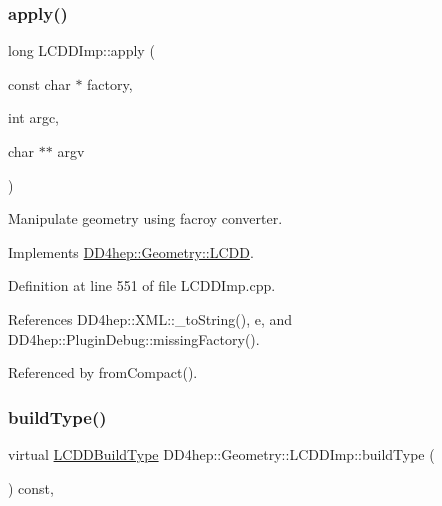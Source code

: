 \subsubsection{\texorpdfstring{apply()}{apply()}}
{\footnotesize\ttfamily long L\+C\+D\+D\+Imp\+::apply (\begin{DoxyParamCaption}\item[{const char $\ast$}]{factory,  }\item[{int}]{argc,  }\item[{char $\ast$$\ast$}]{argv }\end{DoxyParamCaption})\hspace{0.3cm}{\ttfamily [virtual]}}



Manipulate geometry using facroy converter. 



Implements \hyperlink{class_d_d4hep_1_1_geometry_1_1_l_c_d_d_ab47f82e5a5bfda6f58624b3553a08c68}{D\+D4hep\+::\+Geometry\+::\+L\+C\+DD}.



Definition at line 551 of file L\+C\+D\+D\+Imp.\+cpp.



References D\+D4hep\+::\+X\+M\+L\+::\+\_\+to\+String(), e, and D\+D4hep\+::\+Plugin\+Debug\+::missing\+Factory().



Referenced by from\+Compact().

\hypertarget{class_d_d4hep_1_1_geometry_1_1_l_c_d_d_imp_ae875ad95398b372818df92a1e6752ff5}{}\label{class_d_d4hep_1_1_geometry_1_1_l_c_d_d_imp_ae875ad95398b372818df92a1e6752ff5} 
\subsubsection{\texorpdfstring{build\+Type()}{buildType()}}
{\footnotesize\ttfamily virtual \hyperlink{namespace_d_d4hep_acafe43ba4537ab6e999e808142965fab}{L\+C\+D\+D\+Build\+Type} D\+D4hep\+::\+Geometry\+::\+L\+C\+D\+D\+Imp\+::build\+Type (\begin{DoxyParamCaption}{ }\end{DoxyParamCaption}) const\hspace{0.3cm}{\ttfamily [inline]}, {\ttfamily [virtual]}}



